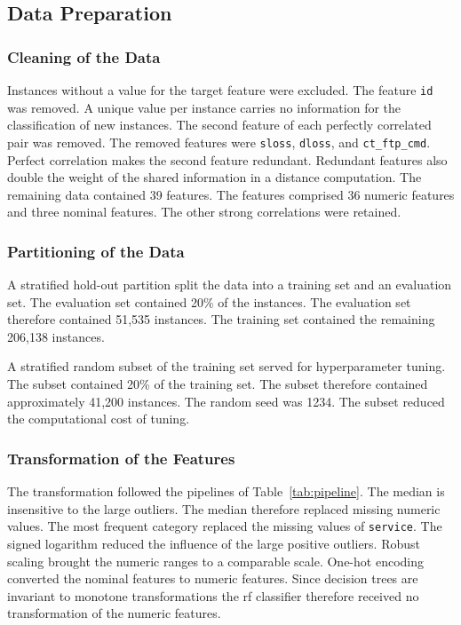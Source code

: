 \documentclass[conference]{IEEEtran}
\begin{document}
\subsection{Data Preparation}
\label{sub:prep}

\subsubsection{Cleaning of the Data}

Instances without a value for the target feature were excluded.
The feature \texttt{id} was removed.
A unique value per instance carries no information for the classification of new instances.
The second feature of each perfectly correlated pair was removed.
The removed features were \texttt{sloss}, \texttt{dloss}, and \texttt{ct\_ftp\_cmd}.
Perfect correlation makes the second feature redundant.
Redundant features also double the weight of the shared information in a distance computation.
The remaining data contained 39 features.
The features comprised 36 numeric features and three nominal features.
The other strong correlations were retained.

\subsubsection{Partitioning of the Data}

A stratified hold-out partition split the data into a training set and an evaluation set.
The evaluation set contained 20\% of the instances.
The evaluation set therefore contained 51,535 instances.
The training set contained the remaining 206,138 instances.

A stratified random subset of the training set served for hyperparameter tuning.
The subset contained 20\% of the training set.
The subset therefore contained approximately 41,200 instances.
The random seed was 1234.
The subset reduced the computational cost of tuning.

\subsubsection{Transformation of the Features}

The transformation followed the pipelines of Table~\ref{tab:pipeline}.
The median is insensitive to the large outliers.
The median therefore replaced missing numeric values.
The most frequent category replaced the missing values of \texttt{service}.
The signed logarithm reduced the influence of the large positive outliers.
Robust scaling brought the numeric ranges to a comparable scale.
One-hot encoding converted the nominal features to numeric features.
Since decision trees are invariant to monotone transformations the \gls{rf} classifier
therefore received no transformation of the numeric features.
\end{document}
